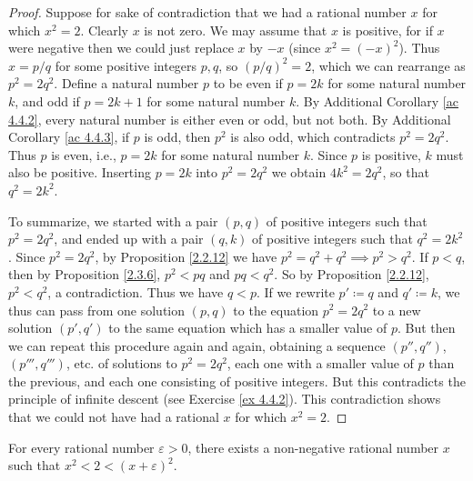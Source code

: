 \begin{proof}
    Suppose for sake of contradiction that we had a rational number \(x\) for which \(x^2 = 2\).
    Clearly \(x\) is not zero.
    We may assume that \(x\) is positive, for if \(x\) were negative then we could just replace \(x\) by \(-x\)
    (since \(x^2 = (-x)^2\)).
    Thus \(x = p / q\) for some positive integers \(p, q\), so \((p / q)^2 = 2\), which we can rearrange as \(p^2 = 2q^2\).
    Define a natural number \(p\) to be even if \(p = 2k\) for some natural number \(k\), and odd if \(p = 2k + 1\) for some natural number \(k\).
    By Additional Corollary \ref{ac 4.4.2}, every natural number is either even or odd, but not both.
    By Additional Corollary \ref{ac 4.4.3}, if \(p\) is odd, then \(p^2\) is also odd, which contradicts \(p^2 = 2q^2\).
    Thus \(p\) is even, i.e., \(p = 2k\) for some natural number \(k\).
    Since \(p\) is positive, \(k\) must also be positive.
    Inserting \(p = 2k\) into \(p^2 = 2q^2\) we obtain \(4k^2 = 2q^2\), so that \(q^2 = 2k^2\).

    To summarize, we started with a pair \((p, q)\) of positive integers such that \(p^2 = 2q^2\), and ended up with a pair \((q, k)\) of positive integers such that \(q^2 = 2k^2\).
    Since \(p^2 = 2q^2\), by Proposition \ref{2.2.12} we have \(p^2 = q^2 + q^2 \implies p^2 > q^2\).
    If \(p < q\), then by Proposition \ref{2.3.6}, \(p^2 < pq\) and \(pq < q^2\).
    So by Proposition \ref{2.2.12}, \(p^2 < q^2\), a contradiction.
    Thus we have \(q < p\).
    If we rewrite \(p' \coloneqq q\) and \(q' \coloneqq k\), we thus can pass from one solution \((p, q)\) to the equation \(p^2 = 2q^2\) to a new solution \((p', q')\) to the same equation which has a smaller value of \(p\).
    But then we can repeat this procedure again and again, obtaining a sequence \((p'', q'')\), \((p''', q''')\), etc. of solutions to \(p^2 = 2q^2\), each one with a smaller value of \(p\) than the previous, and each one consisting of positive integers.
    But this contradicts the principle of infinite descent (see Exercise \ref{ex 4.4.2}).
    This contradiction shows that we could not have had a rational \(x\) for which \(x^2 = 2\).
\end{proof}

\begin{proposition}\label{4.4.5}
    For every rational number \(\varepsilon > 0\), there exists a non-negative rational number \(x\) such that \(x^2 < 2 < (x + \varepsilon)^2\).
\end{proposition}

